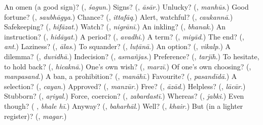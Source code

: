 \begin{tcolorbox}[breakable,colback=teal!4,colframe=teal!35!black,title={Before you move on}]
An omen (a good sign)? (\textbf{}, \emph{śagun}.) Signs? (\textbf{}, \emph{āsār}.) Unlucky? (\textbf{}, \emph{manhūs}.) Good fortune? (\textbf{}, \emph{saubhāgya}.) Chance? (\textbf{}, \emph{ittafāq}.) Alert, watchful? (\textbf{}, \emph{caukannā}.) Safekeeping? (\textbf{}, \emph{hifāzat}.) Watch? (\textbf{}, \emph{nigrānī}.) An inkling? (\textbf{}, \emph{bhanak}.) An instruction? (\textbf{}, \emph{hidāyat}.) A period? (\textbf{}, \emph{avadhi}.) A term? (\textbf{}, \emph{miyād}.) The end? (\textbf{}, \emph{ant}.) Laziness? (\textbf{}, \emph{ālas}.) To squander? (\textbf{}, \emph{luṭānā}.) An option? (\textbf{}, \emph{vikalp}.) A dilemma? (\textbf{}, \emph{duvidhā}.) Indecision? (\textbf{}, \emph{asmañjas}.) Preference? (\textbf{}, \emph{tarjīh}.) To hesitate, to hold back? (\textbf{}, \emph{hicaknā}.) One's own wish? (\textbf{}, \emph{marzī}.) Of one's own choosing? (\textbf{}, \emph{manpasand}.) A ban, a prohibition? (\textbf{}, \emph{manāhī}.) Favourite? (\textbf{}, \emph{pasandīdā}.) A selection? (\textbf{}, \emph{cayan}.) Approved? (\textbf{}, \emph{manzūr}.) Free? (\textbf{}, \emph{āzād}.) Helpless? (\textbf{}, \emph{lācār}.) Stubborn? (\textbf{}, \emph{aṛiyal}.) Force, coercion? (\textbf{}, \emph{zabardastī}.) Whereas? (\textbf{}, \emph{jabki}.) Even though? (\textbf{ }, \emph{bhale hī}.) Anyway? (\textbf{}, \emph{baharhāl}.) Well? (\textbf{}, \emph{khair}.) But (in a lighter register)? (\textbf{}, \emph{magar}.)
\end{tcolorbox}
